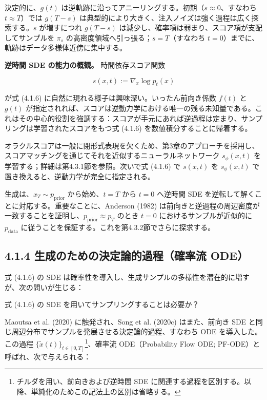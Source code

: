 決定的に、$g(t)$ は逆軌跡に沿ってアニーリングする。初期（$s\approx 0$、すなわち $t\approx T$）では $g(T-s)$ は典型的により大きく、注入ノイズは強く過程は広く探索する。$s$ が増すにつれ $g(T-s)$ は減少し、確率項は弱まり、スコア項が支配してサンプルを $\pi_s$ の高密度領域へ引っ張る；$s=T$（すなわち $t=0$）までに、軌跡はデータ多様体近傍に集中する。

\textbf{逆時間 SDE の能力の概観。} 時間依存スコア関数

\[
s(x,t):=\nabla_x\log p_t(x)
\]


が式 (4.1.6) に自然に現れる様子は興味深い。いったん前向き係数 $f(t)$ と $g(t)$ が指定されれば、スコアは逆動力学における唯一の残る未知量である。これはその中心的役割を強調する：スコアが手元にあれば逆過程は定まり、サンプリングは学習されたスコアをもつ式 (4.1.6) を数値積分することに帰着する。

オラクルスコアは一般に閉形式表現を欠くため、第3章のアプローチを採用し、スコアマッチングを通じてそれを近似するニューラルネットワーク $s_\phi(x,t)$ を学習する；詳細は第4.3.1節を参照。次いで式 (4.1.6) で $s(x,t)$ を $s_\phi(x,t)$ で置き換えると、逆動力学が完全に指定される。

生成は、$x_T\sim p_{\mathrm{prior}}$ から始め、$t=T$ から $t=0$ へ逆時間 SDE を逆転して解くことに対応する。重要なことに、Anderson (1982) は前向きと逆過程の周辺密度が一致することを証明し、$p_{\mathrm{prior}}\approx p_T$ のとき $t=0$ におけるサンプルが近似的に $p_{\mathrm{data}}$ に従うことを保証する。これを第4.3.2節でさらに探求する。


\subsection*{4.1.4 生成のための決定論的過程（確率流 ODE）}


式 (4.1.6) の SDE は確率性を導入し、生成サンプルの多様性を潜在的に増すが、次の問いが生じる：

\begin{propositionbox}[問い 4.1.1]
式 (4.1.6) の SDE を用いてサンプリングすることは必要か？
\end{propositionbox}


Maoutsa et al. (2020) に触発され、Song et al. (2020c) はまた、前向き SDE と同じ周辺分布でサンプルを発展させる決定論的過程、すなわち ODE を導入した。この過程 $\{\tilde{x}(t)\}_{t\in[0,T]}$\footnote{チルダを用い、前向きおよび逆時間 SDE に関連する過程を区別する。以降、単純化のためこの記法上の区別は省略する。}、確率流 ODE（Probability Flow ODE; PF-ODE）と呼ばれ、次で与えられる：

